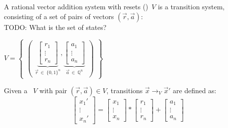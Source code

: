 \begin{frame}[t]
	\frametitle{\qvasr}
	\begin{definition}[\qvasr]
		A rational vector addition system with resets (\qvasr)\ $V$ is a transition system, consisting of a set of pairs of vectors $(\vec{r}, \vec{a})$:\\
		TODO: What is the set of states?
		\begin{center}
			$ V = 
			\begin{Bmatrix}
				\begin{pmatrix}
					\underbrace{
						\begin{bmatrix}
							r_1 \\
							\vdots \\
							r_n
					\end{bmatrix}}_{\vec{r}\ \in\ \{0,1\}^n},
					\underbrace{
						\begin{bmatrix}
							a_1 \\
							\vdots \\
							a_n
					\end{bmatrix}}_{\vec{a}\ \in\ \mathbb{Q}^n}
				\end{pmatrix}
			\end{Bmatrix}
			$
		\end{center}
	\end{definition}
	\begin{center}
		Given a \qvasr\ $V$ with pair $(\vec{r}, \vec{a}) \in V$, transitions $\vec{x} \rightarrow_V \vec{x}'$ are defined as: \\
			\begin{equation*}
				\begin{bmatrix}
					x_1' \\
					\vdots \\
					x_n'
				\end{bmatrix}
				=
				\begin{bmatrix}
					x_1 \\
					\vdots \\
					x_n
				\end{bmatrix}
				*
				\begin{bmatrix}
					r_1 \\
					\vdots \\
					r_n
				\end{bmatrix}
				+
				\begin{bmatrix}
					a_1 \\
					\vdots \\
					a_n
				\end{bmatrix}		
			\end{equation*}
		\end{center}
\end{frame}